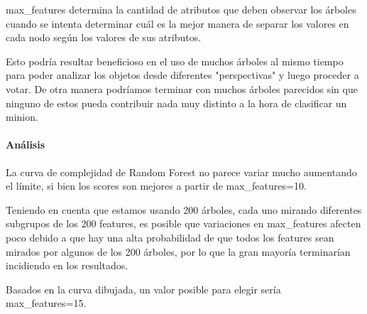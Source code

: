 \documentclass[11pt]{article}
\begin{document}
max\_features determina la cantidad de atributos que deben observar los
árboles cuando se intenta determinar cuál es la mejor manera de separar
los valores en cada nodo según los valores de sus atributos.

Esto podría resultar beneficioso en el uso de muchos árboles al mismo
tiempo para poder analizar los objetos desde diferentes "perspectivas" y
luego proceder a votar. De otra manera podríamos terminar con muchos
árboles parecidos sin que ninguno de estos pueda contribuir nada muy
distinto a la hora de clasificar un minion.

\paragraph{Análisis}\label{anuxe1lisis}

La curva de complejidad de Random Forest no parece variar mucho
aumentando el límite, si bien los scores son mejores a partir de
max\_features=10.

Teniendo en cuenta que estamos usando 200 árboles, cada uno mirando
diferentes subgrupos de los 200 features, es posible que variaciones en
max\_features afecten poco debido a que hay una alta probabilidad de que
todos los features sean mirados por algunos de los 200 árboles, por lo
que la gran mayoría terminarían incidiendo en los resultados.

Basados en la curva dibujada, un valor posible para elegir sería
max\_features=15.
\end{document}

